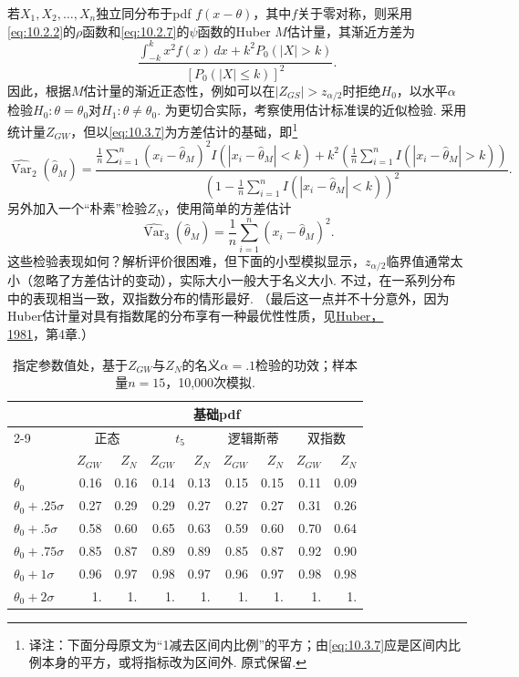 \begin{example}[基于Huber估计量的检验]\label{ex:10.3.7}
若$X_1,X_2,\ldots,X_n$独立同分布于pdf $f(x-\theta)$，其中$f$关于零对称，则采用\eqref{eq:10.2.2}的$\rho$函数和\eqref{eq:10.2.7}的$\psi$函数的Huber $M$估计量，其渐近方差为
\begin{equation}\label{eq:10.3.7}
\frac{\int_{-k}^kx^2f(x)\,dx+k^2P_0(|X|>k)}{[P_0(|X|\leq k)]^2}.
\end{equation}
因此，根据$M$估计量的渐近正态性，例如可以在$|Z_{GS}|>z_{\alpha/2}$时拒绝$H_0$，以水平$\alpha$检验$H_0:\theta=\theta_0$对$H_1:\theta\ne\theta_0$. 为更切合实际，考察使用估计标准误的近似检验. 采用统计量$Z_{GW}$，但以\eqref{eq:10.3.7}为方差估计的基础，即\footnote{译注：下面分母原文为“1减去区间内比例”的平方；由\eqref{eq:10.3.7}应是区间内比例本身的平方，或将指标改为区间外. 原式保留.}
\begin{equation}\label{eq:10.3.8}
\widehat{\operatorname{Var}}_2(\hat\theta_M)=
\frac{\frac1n\sum_{i=1}^n(x_i-\hat\theta_M)^2I(|x_i-\hat\theta_M|<k)+k^2\left(\frac1n\sum_{i=1}^nI(|x_i-\hat\theta_M|>k)\right)}{\left(1-\frac1n\sum_{i=1}^nI(|x_i-\hat\theta_M|<k)\right)^2}.
\end{equation}
另外加入一个“朴素”检验$Z_N$，使用简单的方差估计
\begin{equation}\label{eq:10.3.9}
\widehat{\operatorname{Var}}_3(\hat\theta_M)=\frac1n\sum_{i=1}^n(x_i-\hat\theta_M)^2.
\end{equation}
这些检验表现如何？解析评价很困难，但下面的小型模拟显示，$z_{\alpha/2}$临界值通常太小（忽略了方差估计的变动），实际大小一般大于名义大小. 不过，在一系列分布中的表现相当一致，双指数分布的情形最好. （最后这一点并不十分意外，因为Huber估计量对具有指数尾的分布享有一种最优性性质，见\hyperref[bib:source171]{Huber，1981}，第4章.）
\end{example}

\par\begin{table}[htbp]\centering
\caption{指定参数值处，基于$Z_{GW}$与$Z_N$的名义$\alpha=.1$检验的功效；样本量$n=15$，10,000次模拟.}\label{tab:10.3.6}
\small\begin{tabular}{lrrrrrrrr}\toprule
&\multicolumn{8}{c}{基础pdf}\\\cmidrule(lr){2-9}
&\multicolumn{2}{c}{正态}&\multicolumn{2}{c}{$t_5$}&\multicolumn{2}{c}{逻辑斯蒂}&\multicolumn{2}{c}{双指数}\\
&$Z_{GW}$&$Z_N$&$Z_{GW}$&$Z_N$&$Z_{GW}$&$Z_N$&$Z_{GW}$&$Z_N$\\\midrule
$\theta_0$&0.16&0.16&0.14&0.13&0.15&0.15&0.11&0.09\\
$\theta_0+.25\sigma$&0.27&0.29&0.29&0.27&0.27&0.27&0.31&0.26\\
$\theta_0+.5\sigma$&0.58&0.60&0.65&0.63&0.59&0.60&0.70&0.64\\
$\theta_0+.75\sigma$&0.85&0.87&0.89&0.89&0.85&0.87&0.92&0.90\\
$\theta_0+1\sigma$&0.96&0.97&0.98&0.97&0.96&0.97&0.98&0.98\\
$\theta_0+2\sigma$&1.&1.&1.&1.&1.&1.&1.&1.\\\bottomrule
\end{tabular}
\end{table}\par
